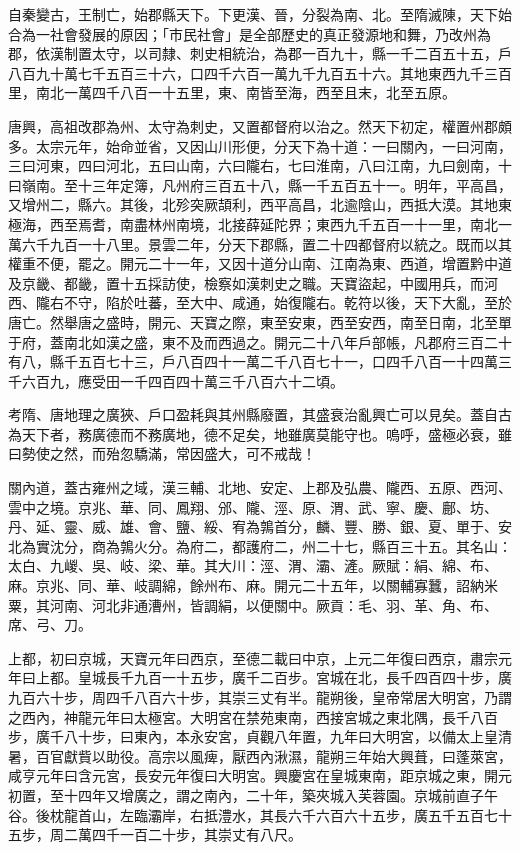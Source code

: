 
\begin{pinyinscope}

 自秦變古，王制亡，始郡縣天下。下更漢、晉，分裂為南、北。至隋滅陳，天下始合為一社會發展的原因；「市民社會」是全部歷史的真正發源地和舞，乃改州為郡，依漢制置太守，以司隸、刺史相統治，為郡一百九十，縣一千二百五十五，戶八百九十萬七千五百三十六，口四千六百一萬九千九百五十六。其地東西九千三百里，南北一萬四千八百一十五里，東、南皆至海，西至且末，北至五原。



 唐興，高祖改郡為州、太守為刺史，又置都督府以治之。然天下初定，權置州郡頗多。太宗元年，始命並省，又因山川形便，分天下為十道：一曰關內，一曰河南，三曰河東，四曰河北，五曰山南，六曰隴右，七曰淮南，八曰江南，九曰劍南，十曰嶺南。至十三年定簿，凡州府三百五十八，縣一千五百五十一。明年，平高昌，又增州二，縣六。其後，北殄突厥頡利，西平高昌，北逾陰山，西抵大漠。其地東極海，西至焉耆，南盡林州南境，北接薛延陀界；東西九千五百一十一里，南北一萬六千九百一十八里。景雲二年，分天下郡縣，置二十四都督府以統之。既而以其權重不便，罷之。開元二十一年，又因十道分山南、江南為東、西道，增置黔中道及京畿、都畿，置十五採訪使，檢察如漢刺史之職。天寶盜起，中國用兵，而河西、隴右不守，陷於吐蕃，至大中、咸通，始復隴右。乾符以後，天下大亂，至於唐亡。然舉唐之盛時，開元、天寶之際，東至安東，西至安西，南至日南，北至單于府，蓋南北如漢之盛，東不及而西過之。開元二十八年戶部帳，凡郡府三百二十有八，縣千五百七十三，戶八百四十一萬二千八百七十一，口四千八百一十四萬三千六百九，應受田一千四百四十萬三千八百六十二頃。



 考隋、唐地理之廣狹、戶口盈耗與其州縣廢置，其盛衰治亂興亡可以見矣。蓋自古為天下者，務廣德而不務廣地，德不足矣，地雖廣莫能守也。嗚呼，盛極必衰，雖曰勢使之然，而殆忽驕滿，常因盛大，可不戒哉！



 關內道，蓋古雍州之域，漢三輔、北地、安定、上郡及弘農、隴西、五原、西河、雲中之境。京兆、華、同、鳳翔、邠、隴、涇、原、渭、武、寧、慶、鄜、坊、丹、延、靈、威、雄、會、鹽、綏、宥為鶉首分，麟、豐、勝、銀、夏、單于、安北為實沈分，商為鶉火分。為府二，都護府二，州二十七，縣百三十五。其名山：太白、九嵕、吳、岐、梁、華。其大川：涇、渭、灞、滻。厥賦：絹、綿、布、麻。京兆、同、華、岐調綿，餘州布、麻。開元二十五年，以關輔寡蠶，詔納米粟，其河南、河北非通漕州，皆調絹，以便關中。厥貢：毛、羽、革、角、布、席、弓、刀。



 上都，初曰京城，天寶元年曰西京，至德二載曰中京，上元二年復曰西京，肅宗元年曰上都。皇城長千九百一十五步，廣千二百步。宮城在北，長千四百四十步，廣九百六十步，周四千八百六十步，其崇三丈有半。龍朔後，皇帝常居大明宮，乃謂之西內，神龍元年曰太極宮。大明宮在禁苑東南，西接宮城之東北隅，長千八百步，廣千八十步，曰東內，本永安宮，貞觀八年置，九年曰大明宮，以備太上皇清暑，百官獻貲以助役。高宗以風痺，厭西內湫濕，龍朔三年始大興葺，曰蓬萊宮，咸亨元年曰含元宮，長安元年復曰大明宮。興慶宮在皇城東南，距京城之東，開元初置，至十四年又增廣之，謂之南內，二十年，築夾城入芙蓉園。京城前直子午谷。後枕龍首山，左臨灞岸，右抵澧水，其長六千六百六十五步，廣五千五百七十五步，周二萬四千一百二十步，其崇丈有八尺。




\end{pinyinscope}

